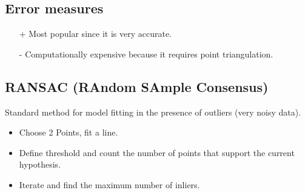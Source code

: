 \documentclass[10pt,a4paper]{scrartcl}
\begin{document}
\begin{multicols*}{2}
\subsection{Error measures}







\begin{itemize}
\item [+] Most popular since it is very accurate.
\item [-] Computationally expensive because it requires point triangulation.
\end{itemize}

\subsection{RANSAC (RAndom SAmple Consensus)}

Standard method for model fitting in the presence of outliers (very noisy data).

\begin{itemize}
\item Choose 2 Points, fit a line.
\item Define threshold and count the number of points that support the current hypothesis.
\item Iterate and find the maximum number of inliers.
\end{itemize}


\end{multicols*}
\end{document}
